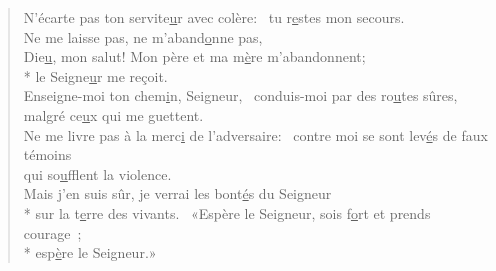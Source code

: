 \begin{verse}
N’écarte pas ton servite\underline{u}r avec colère:~\psalmstar
tu r\underline{e}stes mon secours. \\
Ne me laisse pas, ne m’aband\underline{o}nne pas, \\
Die\underline{u}, mon salut!\psalmstar
{}Mon père et ma m\underline{è}re m’abandonnent; \\*
le Seigne\underline{u}r me reçoit. \\

Enseigne-moi ton chem\underline{i}n, Seigneur,~\psalmstar
conduis-moi par des ro\underline{u}tes sûres, \\
malgré ce\underline{u}x qui me guettent. \\
Ne me livre pas à la merc\underline{i} de l’adversaire:~\psalmstar
contre moi se sont lev\underline{é}s de faux témoins \\
qui so\underline{u}fflent la violence. \\

Mais j’en suis sûr, je verrai les bont\underline{é}s du Seigneur \\*
sur la t\underline{e}rre des vivants.~\psalmstar
{}«Espère le Seigneur, sois f\underline{o}rt et prends courage ; \\*
esp\underline{è}re le Seigneur.» \\
\end{verse}

